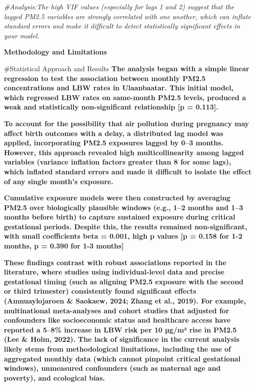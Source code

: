 \documentclass[
]{article}
\newenvironment{Shaded}{\begin{snugshade}}{\end{snugshade}}
\newcommand{\CommentTok}[1]{\textcolor[rgb]{0.56,0.35,0.01}{\textit{#1}}}
\begin{document}
\begin{Shaded}
\begin{Highlighting}[]
\CommentTok{\#Analysis:The high VIF values (especially for lags 1 and 2) suggest that the lagged PM2.5 variables are strongly correlated with one another, which can inflate standard errors and make it difficult to detect statistically significant effects in your model.}
\end{Highlighting}
\end{Shaded}

\textbf{Methodology and Limitations}

\#Statistical Approach and Results \textbf{The analysis began with a
simple linear regression to test the association between monthly PM2.5
concentrations and LBW rates in Ulaanbaatar. This initial model, which
regressed LBW rates on same-month PM2.5 levels, produced a weak and
statistically non-significant relationship {[}p = 0.113{]}.}

\textbf{To account for the possibility that air pollution during
pregnancy may affect birth outcomes with a delay, a distributed lag
model was applied, incorporating PM2.5 exposures lagged by 0--3 months.
However, this approach revealed high multicollinearity among lagged
variables (variance inflation factors greater than 8 for some lags),
which inflated standard errors and made it difficult to isolate the
effect of any single month's exposure.}

\textbf{Cumulative exposure models were then constructed by averaging
PM2.5 over biologically plausible windows (e.g., 1--2 months and 1--3
months before birth) to capture sustained exposure during critical
gestational periods. Despite this, the results remained non-significant,
with small coefficients beta = 0.001, high p values {[}p = 0.158 for 1-2
months, p = 0.390 for 1-3 months{]}}

\textbf{These findings contrast with robust associations reported in the
literature, where studies using individual-level data and precise
gestational timing (such as aligning PM2.5 exposure with the second or
third trimester) consistently found significant effects (Amnuaylojaroen
\& Saokaew, 2024; Zhang et al., 2019). For example, multinational
meta-analyses and cohort studies that adjusted for confounders like
socioeconomic status and healthcare access have reported a 5--8\%
increase in LBW risk per 10 µg/m³ rise in PM2.5 (Lee \& Holm, 2022). The
lack of significance in the current analysis likely stems from
methodological limitations, including the use of aggregated monthly data
(which cannot pinpoint critical gestational windows), unmeasured
confounders (such as maternal age and poverty), and ecological bias.}
\end{document}
